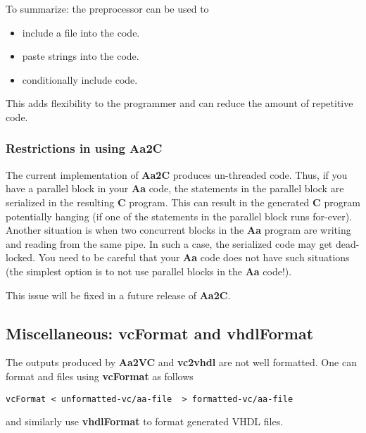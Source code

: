 To summarize: the preprocessor can be used to 
\begin{itemize}
\item include a file into the code.
\item paste strings into the code.
\item conditionally include code.
\end{itemize}
This adds flexibility to the programmer and
can reduce the amount of repetitive code.


\subsubsection{Restrictions in using {\bf Aa2C}}

The current implementation of {\bf Aa2C} produces un-threaded code.
Thus, if you have a parallel block in your {\bf Aa} code, the
statements in the parallel block are serialized in the resulting
{\bf C} program.  This can result in the generated {\bf C} program
potentially hanging (if one of the statements in the parallel
block runs for-ever).   Another situation is when two
concurrent blocks in the {\bf Aa} program are writing and reading
from the same pipe.  In such a case, the serialized code may
get dead-locked.  You need to be careful that your {\bf Aa} code
does not have such situations (the simplest option is
to not use parallel blocks in the {\bf Aa} code!).

This issue will be fixed in a future release of {\bf Aa2C}.

\subsection{Miscellaneous: {\bf vcFormat} and {\bf vhdlFormat}}

The outputs produced by {\bf Aa2VC} and {\bf vc2vhdl} are
not well formatted.  One can format \Aa and \vC files
using  {\bf vcFormat} as follows
\begin{verbatim}
vcFormat < unformatted-vc/aa-file  > formatted-vc/aa-file
\end{verbatim}
and similarly use {\bf vhdlFormat} to format generated
VHDL files.


